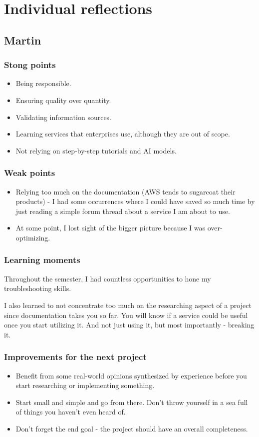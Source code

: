 \documentclass[10pt, a4paper]{article}
\begin{document}
\section{Individual reflections}
\subsection{Martin}
\subsubsection{Stong points}
\begin{itemize}
	\item Being responsible.
	\item Ensuring quality over quantity.
	\item Validating information sources.
	\item Learning services that enterprises use, although they are out of scope.
	\item Not relying on step-by-step tutorials and AI models.
\end{itemize}


\subsubsection{Weak points}
\begin{itemize}
	\item Relying too much on the documentation (AWS tends to sugarcoat their products) - I had some occurrences where I could have saved so much time by just reading a simple forum thread about a service I am about to use.
	\item At some point, I lost sight of the bigger picture because I was over-optimizing.
\end{itemize}

\subsubsection{Learning moments}

Throughout the semester, I had countless opportunities to hone my troubleshooting skills.

I also learned to not concentrate too much on the researching aspect of a project since documentation takes you so far. You will know if a service could be useful once you start utilizing it. And not just using it, but most importantly - breaking it.

\subsubsection{Improvements for the next project}
\begin{itemize}
    \item Benefit from some real-world opinions synthesized by experience before you start researching or implementing something. 
    \item Start small and simple and go from there. Don't throw yourself in a sea full of things you haven't even heard of.
    \item Don't forget the end goal - the project should have an overall completeness.
\end{itemize}
\end{document}
